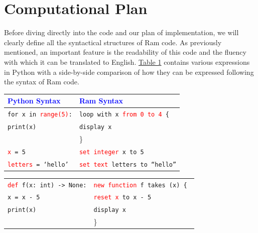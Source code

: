 \documentclass[fontsize=11pt]{article}
\newcommand{\blue}[1]{\textcolor{blue}{#1}}
\newcommand{\red}[1]{\textcolor{red}{#1}}
\begin{document}
\section*{Computational Plan}

Before diving directly into the code and our plan of implementation, we will clearly define all the syntactical structures of Ram code. As previously mentioned, an important feature is the readability of this code and the fluency with which it can be translated to English. \hyperlink{tab1}{Table 1} contains various expressions in Python with a side-by-side comparison of how they can be expressed following the syntax of Ram code.

\begin{center}
    \begin{spacing}{1.1}
    
        \hypertarget{tab1}{}
    
        \begin{tabular}{|l|l|} 
             \hline
             
             \blue{Python Syntax} & \blue{Ram Syntax} \\ 
             
             \hline
             \texttt{for x in \red{range(5)}:} & \texttt{loop with x \red{from 0 to 4} \{ } \\ 
             \quad \quad \texttt{print(x)} & \quad \quad  \texttt{display x} \\
              & \} \\
             
             \hline
             
             \texttt{\red{x} = 5} & \texttt{\red{set integer} x to 5} \\
             
             \hline
             
             \texttt{\red{letters} = `hello'} & \texttt{\red{set text} letters to ``hello''} \\
             
             \hline
             
        \end{tabular}
             
        \begin{tabular}{|l|l|} 
             \hline
             
             \texttt{\red{def} f(x:\,int) -> None:} & \texttt{\red{new function} f takes (x) \{ } \\
             \quad \quad \texttt{x = x - 5} & \quad \quad \texttt{\red{reset x} to x - 5} \\
             \quad \quad \texttt{print(x)} & \quad \quad \texttt{display x} \\
              & \} \\
              

\end{tabular}
\end{spacing}
\end{center}
\end{document}
